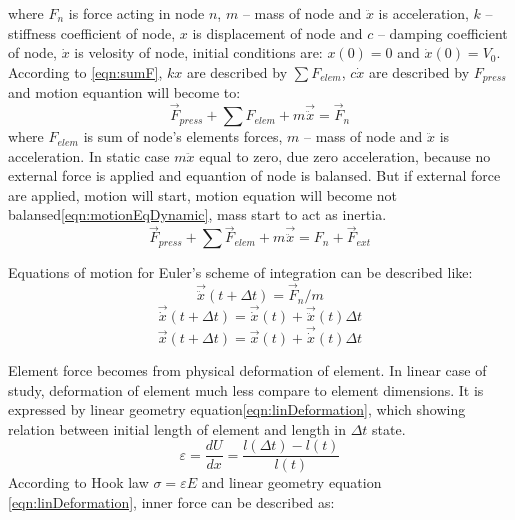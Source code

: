 where $F_n$ is force acting in node $n$, $m$ – mass of node and $\ddot{x}$ is acceleration, $k$ –
stiffness coefficient of node, $x$ is displacement of node and $c$ – damping coefficient of node,
$\dot{x}$ is velosity of node, initial conditions are: $x(0)=0$ and $\dot{x}(0)=V_0$. According to
\ref{eqn:sumF}, $kx$ are described by $\sum{F_{elem}}$, $c\dot{x}$ are described by $F_{press}$ and
motion equantion will become to:
\begin{equation}\label{eqn:motionEqNodeStatic}
  \vec{F}_{press} + \sum{F_{elem}} + m\vec{\ddot{x}} = \vec{F}_n
\end{equation}
where $F_{elem}$ is sum of node's elements forces, $m$ – mass of node and $\ddot{x}$ is
acceleration. In static case $m\ddot{x}$ equal to zero, due zero acceleration, because no external
force is applied and equantion of node is balansed. But if external force are applied, motion will
start, motion equation will become not balansed\ref{eqn:motionEqDynamic}, mass start to act as inertia.
\begin{equation}\label{eqn:motionEqDynamic}
  \vec{F}_{press} + \sum\vec{F}_{elem} + m\vec{\ddot{x}} = F_n + \vec{F}_{ext}
\end{equation}\par
Equations of motion for Euler's scheme of integration can be described like:
\begin{equation}\label{eqn:Accel}
  \vec{\ddot{x}}(t +\Delta t)=\vec{F}_n/m
\end{equation}
\begin{equation}\label{eqn:Velos}
  \vec{\dot{x}}(t +\Delta t)=\vec{\dot{x}}(t)+\vec{\ddot{x}}(t)\Delta t
\end{equation}
\begin{equation}\label{eqn:Displ}
  \vec{x}(t +\Delta t)=\vec{x}(t)+\vec{\dot{x}}(t)\Delta t
\end{equation}
\par Element force becomes from physical deformation of
element. In linear case of study, deformation of element much less compare to
element dimensions. It is expressed by linear geometry
equation\eqref{eqn:linDeformation}, which showing relation between initial
length of element and length in $\Delta t$ state.
\begin{equation}\label{eqn:linDeformation}
  \varepsilon=\frac{dU}{dx}=\frac{l(\Delta t)-l(t)}{l(t)}
\end{equation}
According to Hook law $\sigma=\varepsilon E$ and linear geometry equation
\eqref{eqn:linDeformation}, inner force can be described as:
